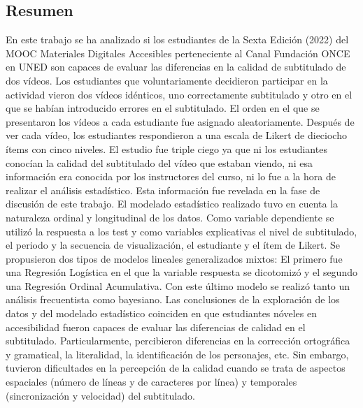 \documentclass[
  12pt,
  a4paper,
  extrafontsizes,
  onecolumn,
  openright,
  table]{memoir}
\begin{document}
\makeatletter
\begin{center} %
\chapter*{Resumen} %
\end{center}   
\makeatother
En este trabajo se ha analizado si los estudiantes de la Sexta Edición (2022) del MOOC Materiales Digitales Accesibles
perteneciente al Canal Fundación \nobreak ONCE en UNED son capaces de evaluar las diferencias
en la calidad de subtitulado de dos vídeos. Los estudiantes que voluntariamente decidieron
participar en la actividad vieron dos vídeos idénticos, uno correctamente subtitulado y otro
en el que se habían introducido errores en el subtitulado. El orden en el que se presentaron los vídeos a cada estudiante
fue asignado aleatoriamente. Después de ver cada vídeo, los estudiantes respondieron a una escala de Likert de dieciocho
ítems con cinco niveles. El estudio fue triple ciego ya que ni los estudiantes conocían la calidad
del subtitulado del vídeo que estaban viendo, ni esa información era conocida por los instructores del curso, ni lo fue a la
hora de realizar el análisis estadístico. Esta información fue revelada en la fase de discusión de este trabajo.
El modelado estadístico realizado tuvo en cuenta la naturaleza ordinal y longitudinal de los datos. Como variable dependiente se
utilizó la respuesta a los test y como variables explicativas el nivel de subtitulado, el periodo y la secuencia de visualización,
el estudiante y el ítem de Likert. Se propusieron dos tipos de modelos lineales generalizados mixtos:
El primero fue una Regresión Logística en el que la variable
respuesta se dicotomizó y el segundo una Regresión Ordinal Acumulativa. Con este último modelo se realizó tanto un análisis frecuentista
como bayesiano. Las conclusiones de la exploración de los datos y del modelado estadístico 
coinciden en que estudiantes nóveles en accesibilidad
fueron capaces de evaluar las diferencias de calidad en el subtitulado. Particularmente, percibieron diferencias en la
corrección ortográfica y gramatical, la literalidad, la identificación de los personajes, etc. Sin embargo, tuvieron dificultades en
la percepción de la calidad cuando se trata de aspectos espaciales (número de líneas y de caracteres por línea)
y temporales (sincronización y velocidad) del subtitulado.
\end{document}
